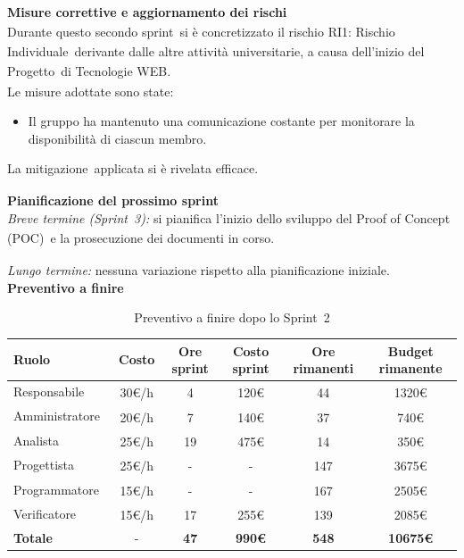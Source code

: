 \documentclass[a4paper,12pt]{article}
\newcommand{\pediceG}{\texorpdfstring{\textsubscript{\scalebox{0.6}{\textbf{G}}}~}{G}}
\begin{document}
\noindent\textbf{Misure correttive e aggiornamento dei rischi\pediceG}\\
Durante questo secondo sprint\pediceG si è concretizzato il rischio RI1: Rischio Individuale\pediceG derivante dalle altre attività universitarie, a causa dell'inizio del Progetto\pediceG di Tecnologie WEB.\\

Le misure adottate sono state:
\begin{itemize}
    \item Il gruppo ha mantenuto una comunicazione costante per monitorare la disponibilità di ciascun membro.
\end{itemize}

La mitigazione\pediceG applicata si è rivelata efficace.

\noindent\textbf{Pianificazione del prossimo sprint}\\
\textit{Breve termine (Sprint\pediceG 3):} si pianifica l'inizio dello sviluppo del Proof of Concept (POC)\pediceG e la prosecuzione dei documenti in corso. 

\textit{Lungo termine:} nessuna variazione rispetto alla pianificazione iniziale.\\

\noindent\textbf{Preventivo a finire}

\begin{table}[H]
\centering
\footnotesize
\begin{tabular}{|l|c|c|c|c|c|}
\hline
Ruolo & Costo & Ore sprint & Costo sprint & Ore rimanenti & Budget rimanente \\
\hline
Responsabile\pediceG & 30€/h & 4 & 120€ & 44 & 1320€ \\
\hline
Amministratore\pediceG & 20€/h & 7 & 140€ & 37 & 740€ \\
\hline
Analista\pediceG & 25€/h & 19 & 475€ & 14 & 350€ \\
\hline
Progettista\pediceG & 25€/h & - & - & 147 & 3675€ \\
\hline
Programmatore\pediceG & 15€/h & - & - & 167 & 2505€ \\
\hline
Verificatore\pediceG & 15€/h & 17 & 255€ & 139 & 2085€ \\
\hline
\textbf{Totale} & - & \textbf{47} & \textbf{990€} & \textbf{548} & \textbf{10675€} \\
\hline
\end{tabular}
\caption{Preventivo a finire dopo lo Sprint\pediceG 2}
\label{tab:risorse-sprint2}
\end{table}
\end{document}
